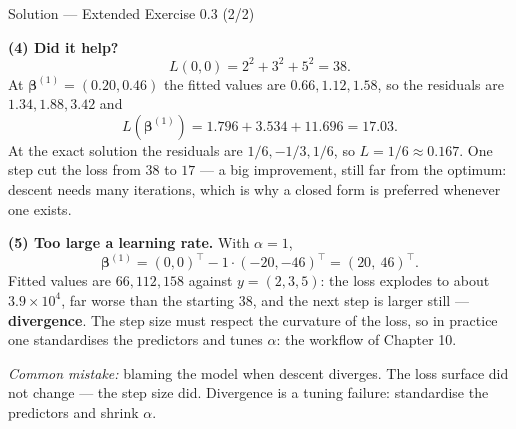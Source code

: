 \documentclass[aspectratio=169,11pt]{beamer}
\begin{document}
\begin{frame}{Solution --- Extended Exercise 0.3 (2/2)}
  \begin{solutionbox}
    \scriptsize
    \textbf{(4) Did it help?}
    \[
      L(0,0) = 2^2+3^2+5^2 = 38 .
    \]
    At $\boldsymbol\beta^{(1)} = (0.20, 0.46)$ the fitted values are
    $0.66, 1.12, 1.58$, so the residuals are $1.34, 1.88, 3.42$ and
    \[
      L(\boldsymbol\beta^{(1)}) = 1.796 + 3.534 + 11.696 = 17.03 .
    \]
    At the exact solution the residuals are $1/6, -1/3, 1/6$, so
    $L = 1/6 \approx 0.167$. One step cut the loss from $38$ to $17$ --- a big
    improvement, still far from the optimum: descent needs many iterations,
    which is why a closed form is preferred whenever one exists.

    \textbf{(5) Too large a learning rate.} With $\alpha = 1$,
    \[
      \boldsymbol\beta^{(1)} = (0,0)^\top - 1\cdot(-20,-46)^\top = (20,\ 46)^\top .
    \]
    Fitted values are $66, 112, 158$ against $y = (2,3,5)$: the loss explodes
    to about $3.9\times10^{4}$, far worse than the starting $38$, and the next
    step is larger still --- \textbf{divergence}. The step size must respect
    the curvature of the loss, so in practice one standardises the predictors
    and tunes $\alpha$: the workflow of Chapter 10.

    \smallskip
    \textit{Common mistake:} blaming the model when descent diverges. The
    loss surface did not change --- the step size did. Divergence is a tuning
    failure: standardise the predictors and shrink $\alpha$.
  \end{solutionbox}
\end{frame}
\end{document}
